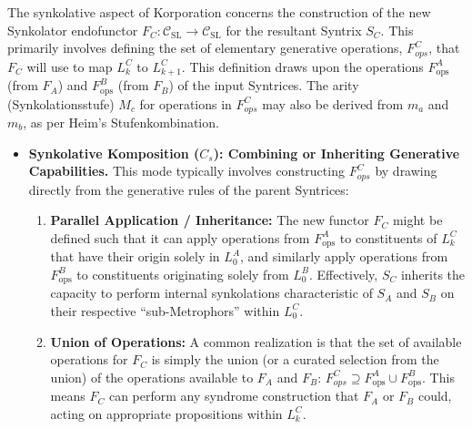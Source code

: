 \documentclass[
    12pt,              %
    a4paper,           %
    headings=normal,   %
    twoside=true,      %
    BCOR=8mm,          %
]{scrbook}
\newcommand{\q}[1]{\enquote{#1}}
\newcommand{\synkolationsstufe}{m}
\newcommand{\fops}{F_{\text{ops}}}
\begin{document}
The synkolative aspect of Korporation concerns the construction of the new Synkolator endofunctor \(F_C: \mathcal{C}_{\text{SL}} \to \mathcal{C}_{\text{SL}}\) for the resultant Syntrix \(S_C\). This primarily involves defining the set of elementary generative operations, \(F_{ops}^C\), that \(F_C\) will use to map \(L_k^C\) to \(L_{k+1}^C\). This definition draws upon the operations \(\fops^A\) (from \(F_A\)) and \(\fops^B\) (from \(F_B\)) of the input Syntrices. The arity (Synkolationsstufe) \(M_c\) for operations in \(F_{ops}^C\) may also be derived from \(\synkolationsstufe_a\) and \(\synkolationsstufe_b\), as per Heim's Stufenkombination.

\begin{itemize}
    \item   \textbf{Synkolative Komposition (\(C_s\)): Combining or Inheriting Generative Capabilities.}
        This mode typically involves constructing \(F_{ops}^C\) by drawing directly from the generative rules of the parent Syntrices:
        \begin{enumerate}[label=(\roman*)]
            \item  \textbf{Parallel Application / Inheritance:} The new functor \(F_C\) might be defined such that it can apply operations from \(\fops^A\) to constituents of \(L_k^C\) that have their origin solely in \(L_0^A\), and similarly apply operations from \(\fops^B\) to constituents originating solely from \(L_0^B\). Effectively, \(S_C\) inherits the capacity to perform internal synkolations characteristic of \(S_A\) and \(S_B\) on their respective \q{sub-Metrophors} within \(L_0^C\).
            \item  \textbf{Union of Operations:} A common realization is that the set of available operations for \(F_C\) is simply the union (or a curated selection from the union) of the operations available to \(F_A\) and \(F_B\): \(F_{ops}^C \supseteq \fops^A \cup \fops^B\). This means \(F_C\) can perform any syndrome construction that \(F_A\) or \(F_B\) could, acting on appropriate propositions within \(L_k^C\).
        \end{enumerate}


\end{itemize}
\end{document}
